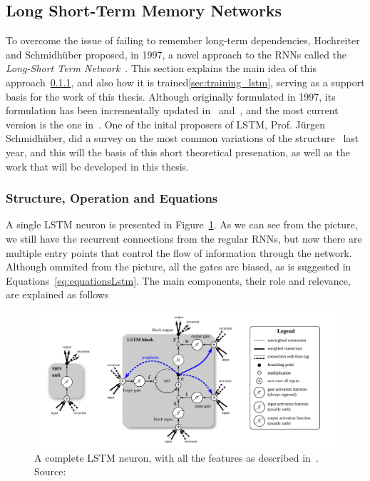 \subsection{Long Short-Term Memory Networks}\label{sec:theorBack_lstm}
To overcome the issue of failing to remember long-term dependencies, Hochreiter and Schmidhüber proposed, in 1997, a novel approach to the RNNs called the \textit{Long-Short Term Network}~\cite{Hoch97}. This section explains the main idea of this approach~\ref{sec:struct_lstm}, and also how it is trained\ref{sec:training_lstm}, serving as a support basis for the work of this thesis.
Although originally formulated in 1997, its formulation has been incrementally updated in~\cite{Gers00} and~\cite{Gers2000}, and the most current version is the one in~\cite{Graves05}. One of the inital proposers of LSTM, Prof. Jürgen Schmidhüber, did a survey on the most common variations of the structure~\cite{Greff15} last year, and this will the basis of this short theoretical presenation, as well as the work that will be developed in this thesis. 

\subsubsection{Structure, Operation and Equations}\label{sec:struct_lstm}
A single LSTM neuron is presented in Figure~\ref{fig:lstmneuron}. As we can see from the picture, we still have the recurrent connections from the regular RNNs, but now there are multiple entry points that control the flow of information through the network. Although ommited from the  picture, all the gates are biased, as is suggested in Equations~\ref{eq:equationsLstm}. The main components, their role and relevance, are explained as follows

\begin{figure}[H]
	\centering
	\includegraphics[width=0.9\linewidth]{figures/lstmneuron.png}
    \caption{A complete LSTM neuron, with all the features as described in~\cite{Graves05}. Source:~\cite{Greff15}}
	\label{fig:lstmneuron}
\end{figure}


